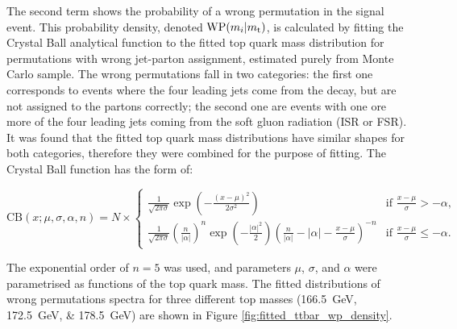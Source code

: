 The second term shows the probability of a wrong permutation in the signal event. This probability density, denoted
$\textrm{WP}(m_i|m_\mathrm{t})$, is calculated by fitting the Crystal Ball analytical function to the fitted top quark mass
distribution for permutations with wrong jet-parton assignment, estimated purely from Monte Carlo \ttbar sample. The
wrong permutations fall in two categories: the first one corresponds to events where the four leading jets come from the
\ttbar decay, but are not assigned to the partons correctly; the second one are events with one ore more of the four
leading jets coming from the soft gluon radiation (ISR or FSR). It was found that the fitted top quark mass
distributions have similar shapes for both categories, therefore they were combined for the purpose of fitting. The
Crystal Ball function has the form of:

\begin{equation}
\textrm{CB}(x;\mu,\sigma,\alpha,n) = N \times
\begin{cases}
\frac{1}{\sqrt{2\pi\sigma}}\exp(-\frac{(x-\mu)^2}{2\sigma^2}) & \text{if $\frac{x-\mu}{\sigma} > -\alpha$,} \\
\frac{1}{\sqrt{2\pi\sigma}}(\frac{n}{|\alpha|})^n
\exp(-\frac{|\alpha|^2}{2})(\frac{n}{|\alpha|}-|\alpha|-\frac{x-\mu}{\sigma})^{-n} & \text{if $\frac{x-\mu}{\sigma}
\leq -\alpha$.}
\end{cases}
\label{eq:crystal_ball}
\end{equation}

The exponential order of $n=\num{5}$ was used, and parameters $\mu$, $\sigma$, and $\alpha$ were parametrised as
functions of the top quark mass. The fitted distributions of wrong permutations spectra for three different top masses
(\SIlist{166.5;172.5;178.5}{\GeV}) are shown in Figure \ref{fig:fitted_ttbar_wp_density}.

